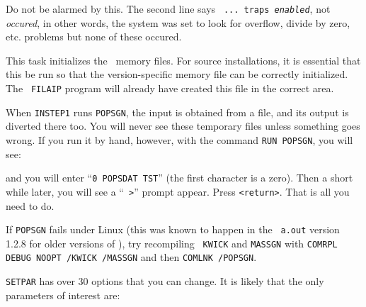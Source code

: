 \noindent Do not be alarmed by this.  The second line says {\tt
... traps {\it enabled\/}}, not {\it occured\/}, in other words, the
system was set to look for overflow, divide by zero, etc. problems but
none of these occured.

\medskip{}

This task initializes the \AIPS\ memory files.  For source
installations, it is essential that this be run so that the
version-specific memory file can be correctly initialized.  The {\tt
FILAIP} program will already have created this file in the correct area.

When {\tt INSTEP1} runs {\tt POPSGN}, the input is obtained from a file,
and its output is diverted there too.  You will never see these
temporary files unless something goes wrong.  If you run it by hand,
however, with the command {\tt RUN POPSGN}, you will see:\medskip

\medskip

\noindent and you will enter ``{\tt 0 POPSDAT TST}'' (the first
character is a zero).  Then a short while later, you will see a ``{\tt
>}'' prompt appear.  Press {\tt <return>}.  That is all you need to do.

If {\tt POPSGN} fails under Linux (this was known to happen in the {\tt
a.out} version 1.2.8 for older versions of \AIPS), try recompiling {\tt
KWICK} and {\tt MASSGN} with {\tt COMRPL DEBUG NOOPT \AIPSUB/KWICK
\AIPSUB/MASSGN} and then {\tt COMLNK \AIPPGM/POPSGN}.

\medskip{}

{\tt SETPAR} has over 30 options that you can change.  It is likely that
the only parameters of interest are:\medskip

